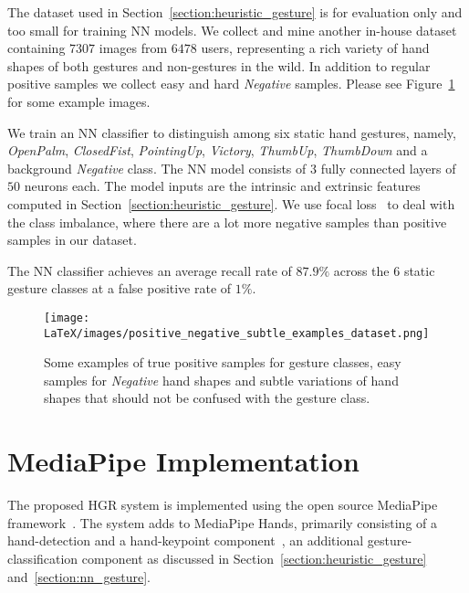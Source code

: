 \documentclass[10pt,twocolumn,letterpaper]{article}
\begin{document}
The dataset used in Section~\ref{section:heuristic_gesture} is for evaluation only and too small for training NN models.
We collect and mine another in-house dataset containing $7307$ images from $6478$ users, representing a rich variety of hand shapes of both gestures and non-gestures in the wild. In addition to regular positive samples we collect easy and hard \textit{Negative} samples. Please see Figure~\ref{fig:dataset_samples} for some example images.

We train an NN classifier to distinguish among six static hand gestures, namely, \textit{OpenPalm}, \textit{ClosedFist}, \textit{PointingUp}, \textit{Victory}, \textit{ThumbUp}, \textit{ThumbDown} and a background \textit{Negative} class.  The NN model consists of $3$ fully connected layers of $50$ neurons each. The model inputs are the intrinsic and extrinsic features computed in Section~\ref{section:heuristic_gesture}. We use focal loss~\cite{lin2017focal} to deal with the class imbalance, where there are a lot more negative samples than positive samples in our dataset.

The NN classifier achieves an average recall rate of $87.9\%$ across the $6$ static gesture classes at a false positive rate of $1\%$.

\begin{figure}
\begin{center}
  \texttt{[image: LaTeX/images/positive\_negative\_subtle\_examples\_dataset.png]}
\end{center}
  \caption{Some examples of true positive samples for gesture classes, easy samples for \textit{Negative} hand shapes and subtle variations of hand shapes that should not be confused with the gesture class.}
\label{fig:dataset_samples}
\end{figure}


\section{MediaPipe Implementation}\label{section:mediapipe}

The proposed HGR system is implemented using the open source MediaPipe framework~\cite{mediapipe_dev}. The system adds to MediaPipe Hands, primarily consisting of a hand-detection and a hand-keypoint component~\cite{zhang20, mediapipe_hands}, an additional gesture-classification component as discussed in Section~\ref{section:heuristic_gesture} and~\ref{section:nn_gesture}.
\end{document}
